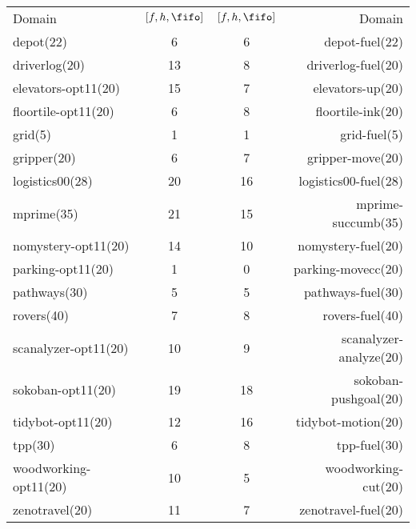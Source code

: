 \begin{center}
\begin{tabular}{|lc|cr|}
Domain & $[f,h,\fifo]$ & $[f,h,\fifo]$ & Domain\\
depot(22) & 6 & 6 & depot-fuel(22)\\
driverlog(20) & 13 & 8 & driverlog-fuel(20)\\
elevators-opt11(20) & 15 & 7 & elevators-up(20)\\
floortile-opt11(20) & 6 & 8 & floortile-ink(20)\\
grid(5) & 1 & 1 & grid-fuel(5)\\
gripper(20) & 6 & 7 & gripper-move(20)\\
logistics00(28) & 20 & 16 & logistics00-fuel(28)\\
mprime(35) & 21 & 15 & mprime-succumb(35)\\
nomystery-opt11(20) & 14 & 10 & nomystery-fuel(20)\\
parking-opt11(20) & 1 & 0 & parking-movecc(20)\\
pathways(30) & 5 & 5 & pathways-fuel(30)\\
rovers(40) & 7 & 8 & rovers-fuel(40)\\
scanalyzer-opt11(20) & 10 & 9 & scanalyzer-analyze(20)\\
sokoban-opt11(20) & 19 & 18 & sokoban-pushgoal(20)\\
tidybot-opt11(20) & 12 & 16 & tidybot-motion(20)\\
tpp(30) & 6 & 8 & tpp-fuel(30)\\
woodworking-opt11(20) & 10 & 5 & woodworking-cut(20)\\
zenotravel(20) & 11 & 7 & zenotravel-fuel(20)\\
\end{tabular}
\end{center}

